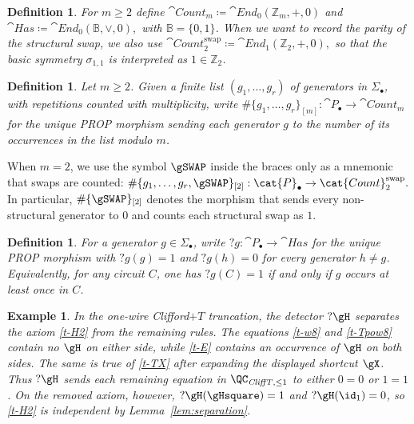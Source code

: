 \documentclass[10pt,a4paper]{article}
\newtheorem{definition}[theorem]{Definition}
\newtheorem{example}[theorem]{Example}
\def\cref#1{Lemma~\ref{#1}}%
\begin{document}
\begin{definition}\label{def:count-has}
For \(m\ge 2\) define
\(
  \cat{Count}_{m}\coloneqq \cat{End}_{0}(\mathbb{Z}_m,+,0)
\)
and
\(
  \cat{Has}\coloneqq \cat{End}_{0}(\mathbb{B},\vee,0),
\)
with \(\mathbb{B}=\{0,1\}\).
When we want to record the parity of the structural swap, we also use
\(
  \cat{Count}^{\mathrm{swap}}_{2}\coloneqq \cat{End}_{1}(\mathbb{Z}_2,+,0),
\)
so that the basic symmetry \(\sigma_{1,1}\) is interpreted as \(1\in\mathbb{Z}_2\).
\end{definition}

\begin{definition}\label{def:counting-notation}
Let \(m\ge 2\).  Given a finite list \((g_1,\ldots,g_r)\) of generators in \(\Sigma_\bullet\), with
repetitions counted with multiplicity, write
\(
  \#\{g_1,\ldots,g_r\}_{[m]}:\cat{P}_\bullet\to\cat{Count}_m
\)
for the unique PROP morphism sending each generator \(g\) to the number of its occurrences in the
list modulo \(m\).
\end{definition}

When \(m=2\), we use the symbol \(\gSWAP\) inside the braces only as a mnemonic that swaps are counted:
\(
  \#\{g_1,\ldots,g_r,\gSWAP\}_{[2]}:\cat{P}_\bullet\to\cat{Count}^{\mathrm{swap}}_2.
\)
In particular, \(\#\{\gSWAP\}_{[2]}\) denotes the morphism that sends every non-structural generator
to \(0\) and counts each structural swap as \(1\).

\begin{definition}\label{def:has-functors}
For a generator \(g\in\Sigma_\bullet\), write
\(
  ?g:\cat{P}_\bullet\to\cat{Has}
\)
for the unique PROP morphism with \(?g(g)=1\) and \(?g(h)=0\) for every generator \(h\neq g\).
Equivalently, for any circuit \(C\), one has \(?g(C)=1\) if and only if \(g\) occurs at least once in
\(C\).
\end{definition}

\begin{example}\label{ex:clifford-t-h2-separator}
In the one-wire Clifford\(+T\) truncation, the detector \(?\gH\) separates the axiom
\eqref{t-H2} from the remaining rules.  The equations \eqref{t-w8} and \eqref{t-Tpow8} contain no
\(\gH\) on either side, while \eqref{t-E} contains an occurrence of \(\gH\) on both sides.  The same is
true of \eqref{t-TX} after expanding the displayed shortcut \(\gX\).  Thus \(?\gH\) sends each
remaining equation in \(\QC_{\mathit{CliffT},\le 1}\) to either \(0=0\) or \(1=1\).  On the removed axiom,
however, \(?\gH(\gHsquare)=1\) and \(?\gH(\id_1)=0\), so \eqref{t-H2} is independent by
\cref{lem:separation}.
\end{example}
\end{document}
